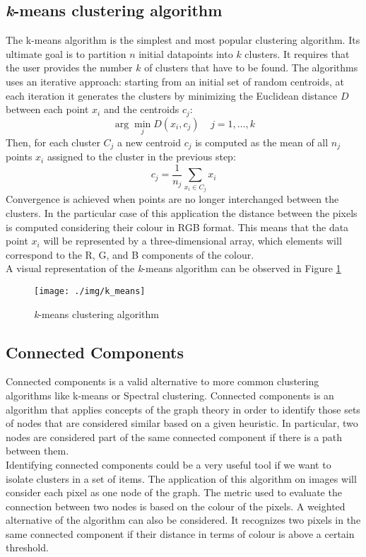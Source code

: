 \documentclass{article}
\begin{document}
{\subsection{\textit{k}-means clustering algorithm} 
The k-means algorithm is the simplest and most popular clustering algorithm. Its ultimate goal is to partition $n$ initial datapoints into $k$ clusters. It requires that the user provides the number $k$ of clusters that have to be found. The algorithms uses an iterative approach: starting from an initial set of random centroids, at each iteration it generates the clusters by minimizing the Euclidean distance $D$ between each point $x_i$  and  the centroids $c_j$:  
$$\arg \min\limits_{j}D(x_i, c_j)\;\;\;\; j = 1, \dots, k$$
Then, for each cluster $C_j$ a new centroid $c_j$ is computed as the mean of all $n_j$ points $x_i$ assigned to the cluster in the previous step: 
$$c_j = \frac{1}{n_j} \sum_{x_i \in C_j} x_i$$
Convergence is achieved when points are no longer interchanged between the clusters.
In the particular case of this application the distance between the pixels is computed considering their colour in RGB format. This means that the data point $x_i$ will be represented by a three-dimensional array, which elements will correspond to the R, G, and B components of the colour. \\
A visual representation of the \textit{k}-means algorithm can be observed in Figure \ref{fig:1}
\begin{figure}[h]
	\centering
	\texttt{[image: ./img/k\_means]}
	\caption{\textit{k}-means clustering algorithm}
	\label{fig:1}
\end{figure}


\subsection{Connected Components}
Connected components is a valid alternative to more common clustering algorithms like k-means or Spectral clustering. 
Connected components is an algorithm that applies concepts of the graph theory in order to identify those sets of nodes that are considered similar based on a given heuristic. In particular, two nodes are considered part of the same connected component if there is a path between them. \\
Identifying connected components could be a very useful tool if we want to isolate clusters in a set of items. 
The application of this algorithm on images will consider each pixel as one node of the graph. The metric used to evaluate the connection between two nodes is based on the colour of the pixels. A weighted alternative of the algorithm can also be considered. It recognizes two pixels in the same connected component if their distance in terms of colour is above a certain threshold.

}
\end{document}
